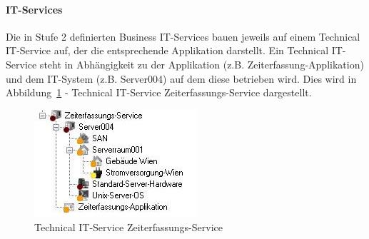 \paragraph{IT-Services}
Die in Stufe 2 definierten Business IT-Services bauen jeweils auf einem Technical IT-Service auf, der die entsprechende Applikation darstellt. Ein Technical IT-Service steht in Abhängigkeit zu der Applikation (z.B. Zeiterfassung-Applikation) und dem IT-System (z.B. Server004) auf dem diese betrieben wird. Dies wird in Abbildung~\ref{fig:Technical} - Technical IT-Service Zeiterfassungs-Service dargestellt.
\newpage
\begin{figure}[htbp]
	\centering
	\includegraphics[scale =1 ]{images/Technical.png}
	\caption{Technical IT-Service Zeiterfassungs-Service}
	\label{fig:Technical}
\end{figure}
